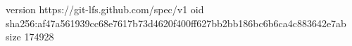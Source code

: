 version https://git-lfs.github.com/spec/v1
oid sha256:af47a561939cc68e7617b73d4620f400ff627bb2bb186bc6b6ca4c883642e7ab
size 174928
